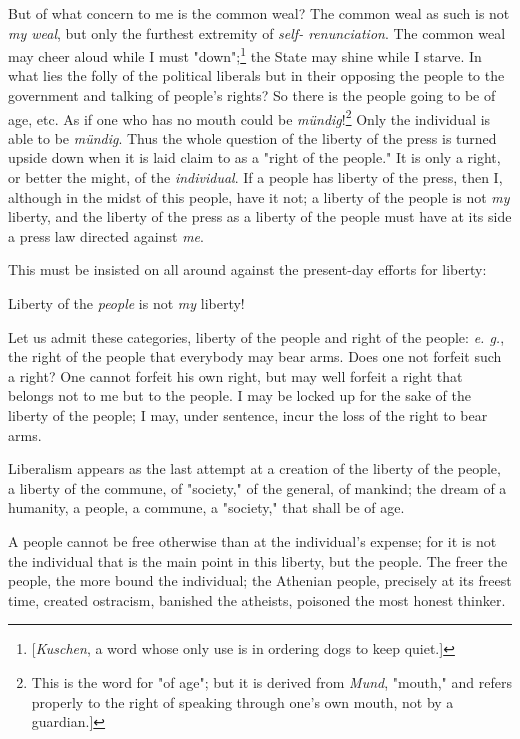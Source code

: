\documentclass[a4paper]{book}
\begin{document}
But of what concern to me is the common weal? The common weal as such is not 
\textit{my weal}, but only the furthest extremity of \textit{self- 
renunciation}. The common weal may cheer aloud while I must 
"{}down"{};\footnote{[\textit{Kuschen}, a word whose only use is in ordering 
dogs to keep quiet.]} the State may shine while I starve. In what lies the 
folly of the political liberals but in their opposing the people to the 
government and talking of people's rights? So there is the people going to be 
of age, etc. As if one who has no mouth could be 
\textit{m\"undig}!\footnote{This is the word for "{}of age"{}; but it is 
derived from \textit{Mund}, "{}mouth,"{} and refers properly to the right of 
speaking through one's own mouth, not by a guardian.]} Only the individual is 
able to be \textit{m\"undig}. Thus the whole question of the liberty of the 
press is turned upside down when it is laid claim to as a "{}right of the 
people."{} It is only a right, or better the might, of the 
\textit{individual}. If a people has liberty of the press, then I, although in 
the midst of this people, have it not; a liberty of the people is not 
\textit{my} liberty, and the liberty of the press as a liberty of the people 
must have at its side a press law directed against \textit{me}.

This must be insisted on all around against the present-day efforts for 
liberty:

Liberty of the \textit{people} is not \textit{my} liberty!

Let us admit these categories, liberty of the people and right of the people: 
\textit{e. g.}, the right of the people that everybody may bear arms. Does one 
not forfeit such a right? One cannot forfeit his own right, but may well 
forfeit a right that belongs not to me but to the people. I may be locked up 
for the sake of the liberty of the people; I may, under sentence, incur the 
loss of the right to bear arms.

Liberalism appears as the last attempt at a creation of the liberty of the 
people, a liberty of the commune, of "{}society,"{} of the general, of 
mankind; the dream of a humanity, a people, a commune, a "{}society,"{} that 
shall be of age.

A people cannot be free otherwise than at the individual's expense; for it is 
not the individual that is the main point in this liberty, but the people. The 
freer the people, the more bound the individual; the Athenian people, 
precisely at its freest time, created ostracism, banished the atheists, 
poisoned the most honest thinker.
\end{document}
